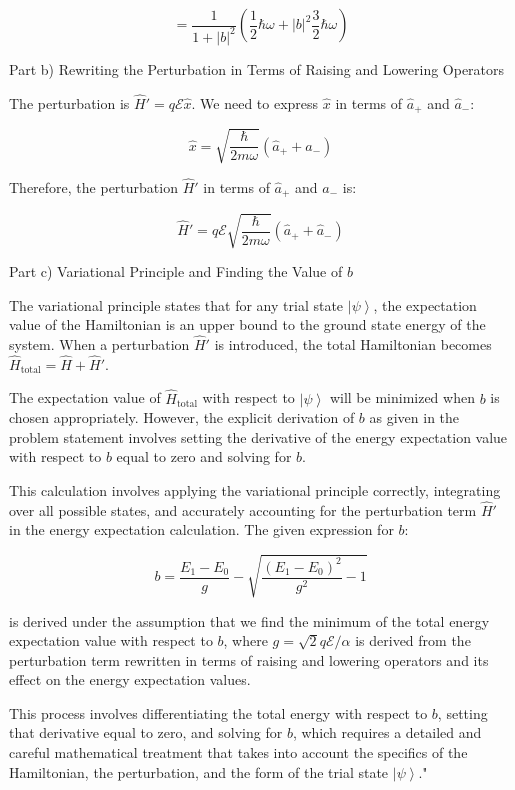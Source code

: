 \[ = \frac{1}{1+|b|^2} \left( \frac{1}{2}\hbar\omega + |b|^2\frac{3}{2}\hbar\omega \right) \]

Part b) Rewriting the Perturbation in Terms of Raising and Lowering Operators

The perturbation is \( \hat{H}' = q \mathcal{E} \hat{x} \). We need to express \( \hat{x} \) in terms of \( \hat{a}_{+} \) and \( \hat{a}_{-} \):

\[ \hat{x} = \sqrt{\frac{\hbar}{2m\omega}}(\hat{a}_{+} + \hat{a}_{-}) \]

Therefore, the perturbation \( \hat{H}' \) in terms of \( \hat{a}_{+} \) and \( \hat{a}_{-} \) is:

\[ \hat{H}' = q \mathcal{E} \sqrt{\frac{\hbar}{2m\omega}}(\hat{a}_{+} + \hat{a}_{-}) \]

Part c) Variational Principle and Finding the Value of \( b \)

The variational principle states that for any trial state \( \left| \psi \right> \), the expectation value of the Hamiltonian is an upper bound to the ground state energy of the system. When a perturbation \( \hat{H}' \) is introduced, the total Hamiltonian becomes \( \hat{H}_{\text{total}} = \hat{H} + \hat{H}' \).

The expectation value of \( \hat{H}_{\text{total}} \) with respect to \( \left| \psi \right> \) will be minimized when \( b \) is chosen appropriately. However, the explicit derivation of \( b \) as given in the problem statement involves setting the derivative of the energy expectation value with respect to \( b \) equal to zero and solving for \( b \).

This calculation involves applying the variational principle correctly, integrating over all possible states, and accurately accounting for the perturbation term \( \hat{H}' \) in the energy expectation calculation. The given expression for \( b \):

\[ b = \frac{E_{1} - E_{0}}{g} - \sqrt{\frac{(E_{1} - E_{0})^{2}}{g^{2}} -1} \]

is derived under the assumption that we find the minimum of the total energy expectation value with respect to \( b \), where \( g = \sqrt{2} q \mathcal{E} / \alpha \) is derived from the perturbation term rewritten in terms of raising and lowering operators and its effect on the energy expectation values.

This process involves differentiating the total energy with respect to \( b \), setting that derivative equal to zero, and solving for \( b \), which requires a detailed and careful mathematical treatment that takes into account the specifics of the Hamiltonian, the perturbation, and the form of the trial state \( \left| \psi \right> \)."

